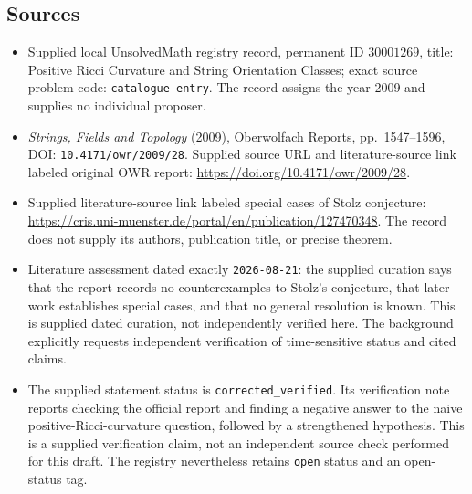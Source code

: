 \documentclass[11pt]{article}
\begin{document}
\subsection{Sources}
\begin{itemize}
\item Supplied local UnsolvedMath registry record, permanent ID \(30001269\), title: Positive Ricci Curvature and String Orientation Classes; exact source problem code: \texttt{catalogue entry}. The record assigns the year 2009 and supplies no individual proposer.
\item \emph{Strings, Fields and Topology} (2009), Oberwolfach Reports, pp.\ 1547--1596, DOI: \texttt{10.4171/owr/2009/28}. Supplied source URL and literature-source link labeled original OWR report: \url{https://doi.org/10.4171/owr/2009/28}.
\item Supplied literature-source link labeled special cases of Stolz conjecture: \url{https://cris.uni-muenster.de/portal/en/publication/127470348}. The record does not supply its authors, publication title, or precise theorem.
\item Literature assessment dated exactly \texttt{2026-08-21}: the supplied curation says that the report records no counterexamples to Stolz's conjecture, that later work establishes special cases, and that no general resolution is known. This is supplied dated curation, not independently verified here. The background explicitly requests independent verification of time-sensitive status and cited claims.
\item The supplied statement status is \texttt{corrected\_verified}. Its verification note reports checking the official report and finding a negative answer to the naive positive-Ricci-curvature question, followed by a strengthened hypothesis. This is a supplied verification claim, not an independent source check performed for this draft. The registry nevertheless retains \texttt{open} status and an open-status tag.
\end{itemize}
\end{document}
